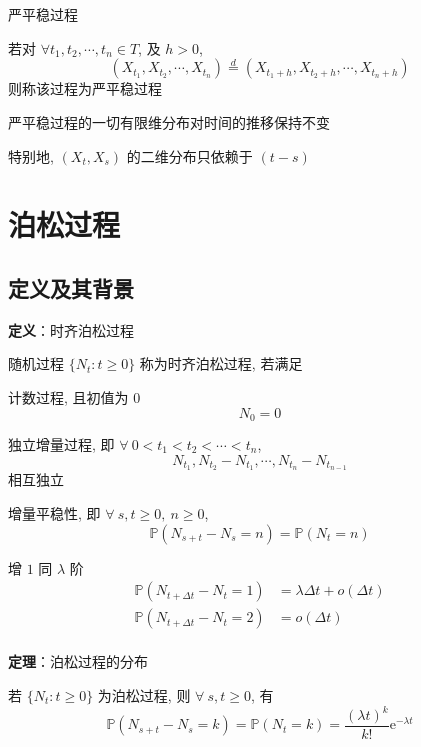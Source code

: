 \documentclass[openany]{ctexbook}
\theoremstyle{kaiti}
\theoremstyle{normal}
\begin{document}
严平稳过程

若对 $\forall t_1,t_2,\cdots,t_n\in T$, 及 $h>0$,
\begin{equation}
  (X_{t_1},X_{t_2},\cdots,X_{t_n})\overset{d}{=}(X_{t_1+h},X_{t_2+h},\cdots,X_{t_n+h})
\end{equation}
则称该过程为严平稳过程

严平稳过程的一切有限维分布对时间的推移保持不变

特别地, $(X_t,X_s)$ 的二维分布只依赖于 $(t-s)$

\chapter{泊松过程}

\section{定义及其背景}
  
\textbf{定义}：时齐泊松过程
  
  随机过程 $\{N_t:t\geqslant0\}$ 称为时齐泊松过程, 若满足

计数过程, 且初值为 $0$
\begin{equation}
    N_0=0
\end{equation}
  

独立增量过程, 即 $\forall~0< t_1 < t_2< \cdots < t_n$, 
\begin{equation}
    N_{t_1},N_{t_2}-N_{t_1},\cdots,N_{t_n}-N_{t_{n-1}}
\end{equation} 相互独立
  

增量平稳性, 即 $\forall~s,t\geqslant0,~n\geqslant0$, 
\begin{equation}
    \mathbb{P}(N_{s+t}-N_s=n)=\mathbb{P}(N_t=n)
\end{equation}
  

增 $1$ 同 $\lambda$ 阶
\begin{equation}
    \begin{aligned}
      \mathbb{P}(N_{t+\Delta t}-N_t=1)&=\lambda\Delta t+o(\Delta t)\\
      \mathbb{P}(N_{t+\Delta t}-N_t=2)&=o(\Delta t)\\
    \end{aligned}
\end{equation}
  
\textbf{定理}：泊松过程的分布
  
  若 $\{N_t:t\geqslant0\}$ 为泊松过程, 则 $\forall~s,t\geqslant0$, 有
\begin{equation}
    \mathbb{P}(N_{s+t}-N_s=k)=\mathbb{P}(N_t=k)=\frac{(\lambda t)^k}{k!}\mathrm{e}^{-\lambda t}
\end{equation}
  
\end{document}

